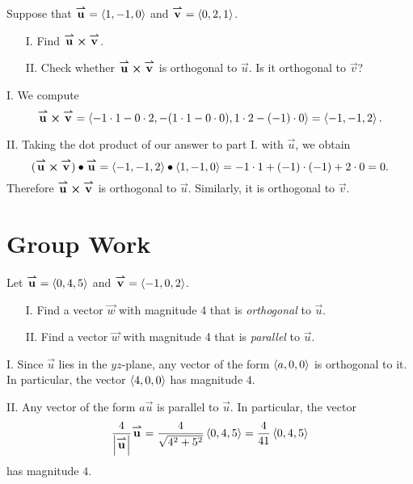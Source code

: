 \documentclass[]{ximera}
\begin{document}
\begin{problem}
Suppose that $\vec{u} = \vector{1,-1,0}$ and $\vec{v} = \vector{0,2,1}$.

\begin{itemize}
\item[I.] Find $\vec{u} \cross \vec{v}$.
\item[II.] Check whether $\vec{u} \cross \vec{v}$ is orthogonal to $\vec{u}$.  Is it orthogonal to $\vec{v}$?  
\end{itemize}

\begin{solution}
I. We compute
$$
\vec{u} \cross \vec{v} = \left<-1 \cdot 1 - 0 \cdot 2, -(1 \cdot 1- 0 \cdot 0), 1 \cdot 2 - (-1) \cdot 0\right> = \left<-1,-1,2\right>.
$$

II. Taking the dot product of our answer to part I. with $\vec{u}$, we obtain
$$
(\vec{u} \cross \vec{v}) \dotp \vec{u} = \left<-1,-1,2\right> \dotp \left<1,-1,0\right> = -1 \cdot 1 + (-1) \cdot (-1) + 2 \cdot 0 = 0.
$$
Therefore $\vec{u} \cross \vec{v}$ is orthogonal to $\vec{u}$. Similarly, it is orthogonal to $\vec{v}$. 
\end{solution}

\end{problem}



\section{Group Work}

\begin{problem}
Let $\vec{u} = \vector{0,4,5}$ and $\vec{v} =\vector{-1,0,2}$. 
\begin{itemize}
\item[I.] Find a vector $\vec{w}$ with magnitude 4 that is \emph{orthogonal} to $\vec{u}$.
\item[II.] Find a vector $\vec{w}$ with magnitude 4 that is \emph{parallel} to $\vec{u}$.

\end{itemize}
\begin{freeResponse}
I. Since $\vec{u}$ lies in the $yz$-plane, any vector of the form $\vector{a,0,0}$ is orthogonal to it. In particular, the vector $\vector{4,0,0}$ has magnitude $4$. 

II. Any vector of the form $a \vec{u}$ is parallel to $\vec{u}$. In particular, the vector
$$
\frac{4}{\left|\vec{u}\right|} \vec{u} = \frac{4}{\sqrt{4^2 + 5^2}} \vector{0,4,5} = \frac{4}{41}\vector{0,4,5}
$$
has magnitude $4$. 
\end{freeResponse}
\end{problem}
\end{document}
